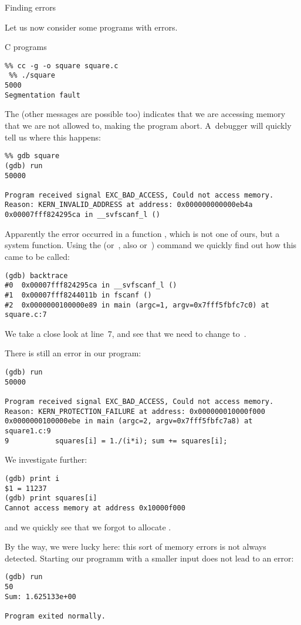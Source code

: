  {Finding errors}

Let us now consider some programs with errors.

 {C programs}

\begin{verbatim}
%% cc -g -o square square.c
 %% ./square
5000
Segmentation fault
\end{verbatim}
The  (other messages are possible too) 
indicates that we are accessing
memory that we are not allowed to, making the program
abort. A~debugger will quickly tell us where this happens:
\begin{verbatim}
%% gdb square
(gdb) run
50000

Program received signal EXC_BAD_ACCESS, Could not access memory.
Reason: KERN_INVALID_ADDRESS at address: 0x000000000000eb4a
0x00007fff824295ca in __svfscanf_l ()
\end{verbatim}
Apparently the error occurred in a function , which is
not one of ours, but a system function. Using the 
(or~, also  or~) command we quickly find out how
this came to be called:
{\small
\begin{verbatim}
(gdb) backtrace
#0  0x00007fff824295ca in __svfscanf_l ()
#1  0x00007fff8244011b in fscanf ()
#2  0x0000000100000e89 in main (argc=1, argv=0x7fff5fbfc7c0) at square.c:7
\end{verbatim}
}
We take a close look at line~7, and see that we need to
change  to~.

There is still an error in our program:
{\small
\begin{verbatim}
(gdb) run
50000

Program received signal EXC_BAD_ACCESS, Could not access memory.
Reason: KERN_PROTECTION_FAILURE at address: 0x000000010000f000
0x0000000100000ebe in main (argc=2, argv=0x7fff5fbfc7a8) at square1.c:9
9           squares[i] = 1./(i*i); sum += squares[i];
\end{verbatim}
}
We investigate further:
\begin{verbatim}
(gdb) print i
$1 = 11237
(gdb) print squares[i]
Cannot access memory at address 0x10000f000
\end{verbatim}
and we quickly see that we forgot to allocate .

By the way, we were lucky here: this sort of memory errors is not always
detected. Starting our programm with a smaller input does not lead to
an error:
\begin{verbatim}
(gdb) run
50
Sum: 1.625133e+00

Program exited normally.
\end{verbatim}

